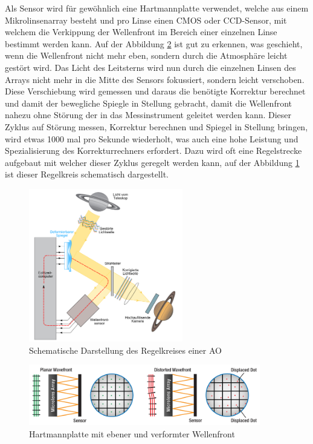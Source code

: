 \begin{refsection}
Als Sensor wird für gewöhnlich eine Hartmannplatte verwendet, welche aus einem Mikrolinsenarray besteht und pro Linse einen CMOS oder CCD-Sensor, mit welchem die Verkippung der Wellenfront im Bereich einer einzelnen Linse bestimmt werden kann. Auf der Abbildung \ref{fig:hartmannplatte} ist gut zu erkennen, was geschieht, wenn die Wellenfront nicht mehr eben, sondern durch die Atmosphäre leicht gestört wird. Das Licht des Leitsterns wird nun durch die einzelnen Linsen des Arrays nicht mehr in die Mitte des Sensors fokussiert, sondern leicht verschoben. Diese Verschiebung wird gemessen und daraus die benötigte Korrektur berechnet und damit der bewegliche Spiegle in Stellung gebracht, damit die Wellenfront nahezu ohne Störung der in das Messinstrument geleitet werden kann. Dieser Zyklus auf Störung messen, Korrektur berechnen und Spiegel in Stellung bringen, wird etwas 1000 mal pro Sekunde wiederholt, was auch eine hohe Leistung und Spezialisierung des Korrekturrechners erfordert. Dazu wird oft eine Regelstrecke aufgebaut mit welcher dieser Zyklus geregelt werden kann, auf der Abbildung \ref{fig:schematischAO} ist dieser Regelkreis schematisch dargestellt.

\begin{figure}
  \centering
  \includegraphics[width=0.6\textwidth]{adaptiv/images/schematichAO}
  \caption{Schematische Darstellung des Regelkreises einer AO
    \cite{robani:schematischAO}}
  \label{fig:schematischAO}
\end{figure}

\begin{figure}
  \centering
  \includegraphics[width=0.9\textwidth]{adaptiv/images/hartmannplatte}
  \caption{Hartmannplatte mit ebener und verformter Wellenfront
    \cite{thor:hartmannplatte}}
  \label{fig:hartmannplatte}
\end{figure}


\end{refsection}
